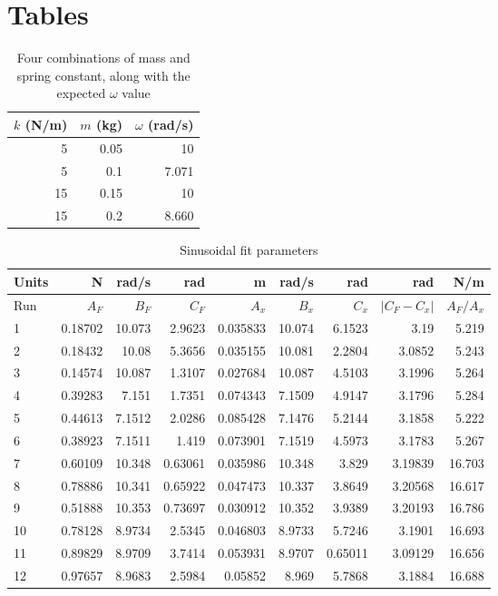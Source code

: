 \section{Tables}
\begin{table}[ht]
    \centering
    \begin{tabular}{|r|r|r|}\hline
        $k$ (N/m) & $m$ (kg) & $\omega$ (rad/s) \\ \hline
        5 & 0.05 & 10 \\
        5 & 0.1 & 7.071 \\
        15 & 0.15 & 10 \\
        15 & 0.2 & 8.660 \\
        \hline
    \end{tabular}
    \caption{Four combinations of mass and spring constant, along with the expected $\omega$ value}
    \label{table.11.parameters}
\end{table}
\begin{table}[ht]
    \centering
    \begin{tabular}{|l|r|r|r|r|r|r|r|r|}
        \hline
        Units & N & rad/s & rad & m & rad/s & rad & rad & N/m \\
        \hline
        Run & $A_{F}$ & $B_{F}$ & $C_{F}$ & $A_{x}$ & $B_{x}$ & $C_{x}$ & $\vert C_{F} - C_{x} \vert$ & $A_{F} / A_{x}$ \\
        \hline
        1 & 0.18702 & 10.073 & 2.9623 & 0.035833 & 10.074 & 6.1523 & 3.19 & 5.219 \\
        2 & 0.18432 & 10.08 & 5.3656 & 0.035155 & 10.081 & 2.2804 & 3.0852 & 5.243 \\
        3 & 0.14574 & 10.087 & 1.3107 & 0.027684 & 10.087 & 4.5103 & 3.1996 & 5.264 \\
        \hline
        4 & 0.39283 & 7.151 & 1.7351 & 0.074343 & 7.1509 & 4.9147 & 3.1796 & 5.284 \\
        5 & 0.44613 & 7.1512 & 2.0286 & 0.085428 & 7.1476 & 5.2144 & 3.1858 & 5.222 \\
        6 & 0.38923 & 7.1511 & 1.419 & 0.073901 & 7.1519 & 4.5973 & 3.1783 & 5.267 \\
        \hline
        7 & 0.60109 & 10.348 & 0.63061 & 0.035986 & 10.348 & 3.829 & 3.19839 & 16.703 \\
        8 & 0.78886 & 10.341 & 0.65922 & 0.047473 & 10.337 & 3.8649 & 3.20568 & 16.617 \\
        9 & 0.51888 & 10.353 & 0.73697 & 0.030912 & 10.352 & 3.9389 & 3.20193 & 16.786 \\
        \hline
        10 & 0.78128 & 8.9734 & 2.5345 & 0.046803 & 8.9733 & 5.7246 & 3.1901 & 16.693 \\
        11 & 0.89829 & 8.9709 & 3.7414 & 0.053931 & 8.9707 & 0.65011 & 3.09129 & 16.656 \\
        12 & 0.97657 & 8.9683 & 2.5984 & 0.05852 & 8.969 & 5.7868 & 3.1884 & 16.688 \\
        \hline
    \end{tabular}
    \caption{Sinusoidal fit parameters}
    \label{table.11.fit}
\end{table}
